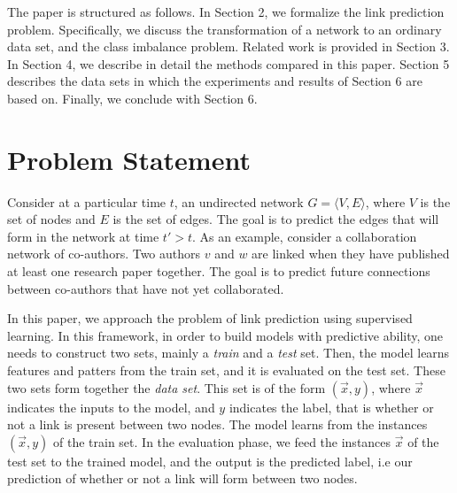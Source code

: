 \documentclass{acm_proc_article-sp}
\begin{document}

The paper is structured as follows. In Section 2, we formalize the link prediction problem. Specifically, we discuss the transformation of a network to an ordinary data set, and the class imbalance problem. Related work is provided in Section 3. In Section 4, we describe in detail the methods compared in this paper. Section 5 describes the data sets in which the experiments and results of Section 6 are based on. Finally, we conclude with Section 6.  


\section{Problem Statement} 

Consider at a particular time $t$, an undirected network $G = \langle V,E \rangle$, where $V$ is the set of nodes and $E$ is the set of edges. The goal is to predict the edges that will form in the network at time $t' > t$. As an example, consider a collaboration network of co-authors. Two authors $v$ and $w$ are linked when they have published at least one research paper together. The goal is to predict future connections between co-authors that have not yet collaborated.

In this paper, we approach the problem of link prediction using supervised learning. In this framework, in order to build models with predictive ability, one needs to construct two sets, mainly a \textit{train} and a \textit{test} set. Then, the model learns features and patters from the train set, and it is evaluated on the test set. These two sets form together the \textit{data set}. This set is of the form $(\vec{x},y)$, where $\vec{x}$ indicates the inputs to the model, and $y$ indicates the label, that is whether or not a link is present between two nodes. The model learns from the instances $(\vec{x},y)$ of the train set. In the evaluation phase, we feed the instances $\vec{x}$ of the test set to the trained model, and the output is the predicted label, i.e our prediction of whether or not a link will form between two nodes.
\end{document}

